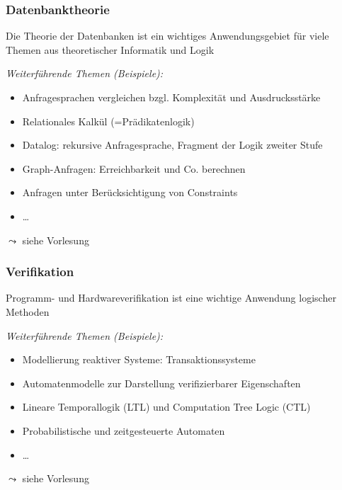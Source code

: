 \documentclass[onlymath]{beamer}
\begin{document}
\begin{frame}\frametitle{Datenbanktheorie}

Die Theorie der Datenbanken ist ein wichtiges Anwendungsgebiet für
viele Themen aus theoretischer Informatik und Logik\bigskip

\emph{Weiterführende Themen (Beispiele):}
\begin{itemize}
\item Anfragesprachen vergleichen bzgl. Komplexität und Ausdrucksstärke
\item Relationales Kalkül (=Prädikatenlogik)
\item Datalog: rekursive Anfragesprache, Fragment der Logik zweiter Stufe
\item Graph-Anfragen: Erreichbarkeit und Co. berechnen
\item Anfragen unter Berücksichtigung von Constraints
\item \ldots
\end{itemize}

$\leadsto$ siehe Vorlesung 

\end{frame}

\begin{frame}\frametitle{Verifikation}

Programm- und Hardwareverifikation ist eine wichtige Anwendung logischer Methoden
\bigskip

\emph{Weiterführende Themen (Beispiele):}
\begin{itemize}
\item Modellierung reaktiver Systeme: Transaktionssysteme
\item Automatenmodelle zur Darstellung verifizierbarer Eigenschaften
\item Lineare Temporallogik (LTL) und Computation Tree Logic (CTL)
\item Probabilistische und zeitgesteuerte Automaten
\item \ldots
\end{itemize}

$\leadsto$ siehe Vorlesung 

\end{frame}
\end{document}
